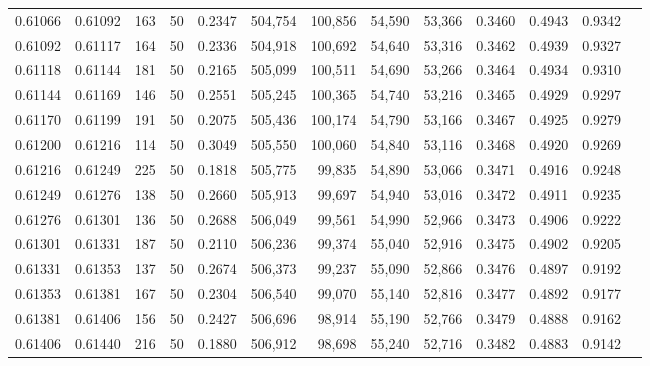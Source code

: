 \begin{tabular}{rrrrrrrrrrrrr}
0.61066 & 0.61092 &   163 &  50 &                                     0.2347 & 504,754 & 100,856 &  54,590 &  53,366 & 0.3460 & 0.4943 & 0.9342 \\
0.61092 & 0.61117 &   164 &  50 &                                     0.2336 & 504,918 & 100,692 &  54,640 &  53,316 & 0.3462 & 0.4939 & 0.9327 \\
0.61118 & 0.61144 &   181 &  50 &                                     0.2165 & 505,099 & 100,511 &  54,690 &  53,266 & 0.3464 & 0.4934 & 0.9310 \\
0.61144 & 0.61169 &   146 &  50 &                                     0.2551 & 505,245 & 100,365 &  54,740 &  53,216 & 0.3465 & 0.4929 & 0.9297 \\
0.61170 & 0.61199 &   191 &  50 &                                     0.2075 & 505,436 & 100,174 &  54,790 &  53,166 & 0.3467 & 0.4925 & 0.9279 \\
0.61200 & 0.61216 &   114 &  50 &                                     0.3049 & 505,550 & 100,060 &  54,840 &  53,116 & 0.3468 & 0.4920 & 0.9269 \\
0.61216 & 0.61249 &   225 &  50 &                                     0.1818 & 505,775 &  99,835 &  54,890 &  53,066 & 0.3471 & 0.4916 & 0.9248 \\
0.61249 & 0.61276 &   138 &  50 &                                     0.2660 & 505,913 &  99,697 &  54,940 &  53,016 & 0.3472 & 0.4911 & 0.9235 \\
0.61276 & 0.61301 &   136 &  50 &                                     0.2688 & 506,049 &  99,561 &  54,990 &  52,966 & 0.3473 & 0.4906 & 0.9222 \\
0.61301 & 0.61331 &   187 &  50 &                                     0.2110 & 506,236 &  99,374 &  55,040 &  52,916 & 0.3475 & 0.4902 & 0.9205 \\
0.61331 & 0.61353 &   137 &  50 &                                     0.2674 & 506,373 &  99,237 &  55,090 &  52,866 & 0.3476 & 0.4897 & 0.9192 \\
0.61353 & 0.61381 &   167 &  50 &                                     0.2304 & 506,540 &  99,070 &  55,140 &  52,816 & 0.3477 & 0.4892 & 0.9177 \\
0.61381 & 0.61406 &   156 &  50 &                                     0.2427 & 506,696 &  98,914 &  55,190 &  52,766 & 0.3479 & 0.4888 & 0.9162 \\
0.61406 & 0.61440 &   216 &  50 &                                     0.1880 & 506,912 &  98,698 &  55,240 &  52,716 & 0.3482 & 0.4883 & 0.9142 \\

\end{tabular}
